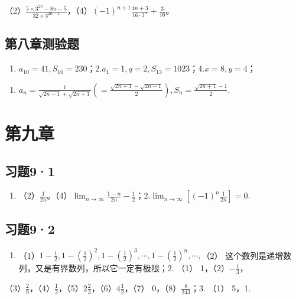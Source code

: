 （2）\(\frac{5 \times 3^{2n} - 8n - 5}{32 \times 3^{2n - 1}}\)，（4）\((-1)^{n+1} \frac{4n + 3}{16 \cdot 3^n} + \frac{3}{16}\)。

\subsection{第八章测验题}

\begin{enumerate}[start=1]
\item
  \(a_{10} = 41, S_{10} = 230\)；2.\(a_1 = 1, q = 2, S_{13} = 1023\)；4.\(x = 8, y = 4\)；
\end{enumerate}

\begin{enumerate}[start=5]
\item
  \(a_{n} = \frac{1}{\sqrt{2n - 1} + \sqrt{2n + 1}}\left( = \frac{\sqrt{2n + 1} - \sqrt{2n - 1}}{2}\right), S_{n} = \frac{\sqrt{2n + 1} - 1}{2}.\)
\end{enumerate}

\section{第九章}

\subsection{习题9·1}

\begin{enumerate}
\item
  （2）\(\frac{1}{2n}\)。（4）\(\lim_{n\to \infty}\frac{1 - n}{2n} -\frac{1}{2}\)；2.\(\lim_{n\to \infty}\left[(-1)^n\frac{1}{2n}\right] = 0.\)
\end{enumerate}

\subsection{习题9·2}

\begin{enumerate}
\item
  （1）\(1 - \frac{1}{2}, 1 - \left(\frac{1}{2}\right)^2, 1 - \left(\frac{1}{2}\right)^3, \cdots, 1 - \left(\frac{1}{2}\right)^n, \cdots,\)（2）
  这个数列是递增数列，又是有界数列，所以它一定有极限；2. （1）
  1，（2）\(-\frac{1}{3}\)，
\end{enumerate}

（3）\(\frac{2}{9}\)，（4）\(\frac{1}{2}\)，（5）\(2\frac{2}{3}\)，（6）\(4\frac{1}{2}\)，（7）
0，（8）\(\frac{8}{243}\)；3. （1） 5，1.

